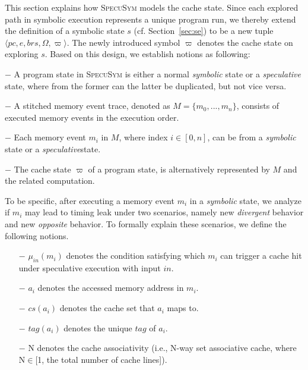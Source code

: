 \documentclass[sigconf]{acmart}
\newcommand\ignore[1]{}
\newcommand{\pcon}{\mathit{pc}}
\newcommand{\SpecuSym}{\textsc{SpecuSym} }
\begin{document}
This section explains how \SpecuSym models the cache state. Since each explored 
path in symbolic execution represents a unique program run, we thereby extend 
the definition of a symbolic state $s$ (cf. Section~\ref{sec:se}) to be a new 
tuple $\langle \pcon, \mathit{e}, \mathit{brs}, \Omega, \varpi \rangle$. The 
newly introduced symbol $\varpi$ denotes the cache state on exploring $s$.
Based on this design, we establish notions as following:
%
%
\begin{itemize*}
  \item [$-$]A program state in \SpecuSym is either a normal \textit{symbolic} 
    state or a \textit{speculative} state, where from the former can the latter 
    be duplicated, but not vice versa. 
  \item [$-$]A stitched memory event trace, denoted as $\mathit{M}=\mathit{\{m_0,...,m_n\}}$, 
    consists of executed memory events in the execution order.
  \item [$-$]Each memory event $\mathit{m_i}$ in $\mathit{M}$, where index 
    $i\in [0,n]$, can be from a \textit{symbolic} state or a \textit{speculative}state.
  \item [$-$]The cache state $\varpi$ of a program state, is alternatively
    represented by $\mathit{M}$ and the related computation.
\end{itemize*}
%
%
\ignore{
On modeling the cache state, exsiting tools such as CaSym~\cite{BrotzmanLZTK2018} 
maintains and updates cache mappings during symbolic execution; others like 
Chalice~\cite{ChattopadhyayBRZ17} and \textsc{SymSC}~\cite{GuoWW18} uses 
offline constraint solving to to reason about the cache behaviors of memory 
accesses upon concrete cache models. To better coordinate the speculative 
modeling component, \SpecuSym adopts an on-the-fly analysis.
}

To be specific, after executing a memory event $m_i$ in a \textit{symbolic} state, 
we analyze if $\mathit{m_i}$ may lead to timing leak under two scenarios, namely 
new \textit{divergent} behavior and new \textit{opposite} behavior. To formally 
explain these scenarios, we define the following notions.

%
\begin{itemize}
  \item [$-$]$\mathit{\mu_{in}(m_i)}$ denotes the condition satisfying which 
    $\mathit{m_i}$ can trigger a cache hit under speculative execution with 
    input $\mathit{in}$. 
  \item [$-$]$\mathit{a_i}$ denotes the accessed memory address in $\mathit{m_i}$.
  \item [$-$]$\mathit{cs(a_i)}$ denotes the cache set that $\mathit{a_i}$ 
    maps to.
  \item [$-$]$\mathit{tag(a_i)}$ denotes the unique $\mathit{tag}$ of $\mathit{a_i}$.
  \item [$-$]{N} denotes the cache associativity (i.e., N-way set associative 
    cache, where N$\in$[1, the total number of cache lines]). 
\end{itemize}
%
\end{document}
